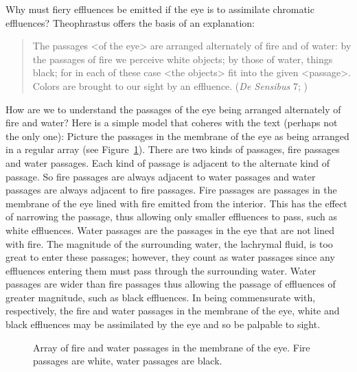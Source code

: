 Why must fiery effluences be emitted if the eye is to assimilate chromatic effluences? Theophrastus offers the basis of an explanation:
\begin{quote}
	The passages <of the eye> are arranged alternately of fire and of water: by the passages of fire we perceive white objects; by those of water, things black; for in each of these case <the objects> fit into the given <passage>. Colors are brought to our sight by an effluence. (\emph{De Sensibus} 7; \citealt{Stratton:1917vn})
\end{quote}
How are we to understand the passages of the eye being arranged alternately of fire and water? Here is a simple model that coheres with the text (perhaps not the only one): Picture the passages in the membrane of the eye as being arranged in a regular array (see Figure~\ref{fig:1}). There are two kinds of passages, fire passages and water passages. Each kind of passage is adjacent to the alternate kind of passage. So fire passages are always adjacent to water passages and water passages are always adjacent to fire passages. Fire passages are passages in the membrane of the eye lined with fire emitted from the interior. This has the effect of narrowing the passage, thus allowing only smaller effluences to pass, such as white effluences. Water passages are the passages in the eye that are not lined with fire. The magnitude of the surrounding water, the lachrymal fluid, is too great to enter these passages; however, they count as water passages since any effluences entering them must pass through the surrounding water. Water passages are wider than fire passages thus allowing the passage of effluences of greater magnitude, such as black effluences. In being commensurate with, respectively, the fire and water passages in the membrane of the eye, white and black effluences may be assimilated by the eye and so be palpable to sight. 

\begin{figure}[ht]
    \begin{center}
    \end{center}
    \caption{Array of fire and water passages in the membrane of the eye. Fire passages are white, water passages are black.}
    \label{fig:1}
\end{figure}

